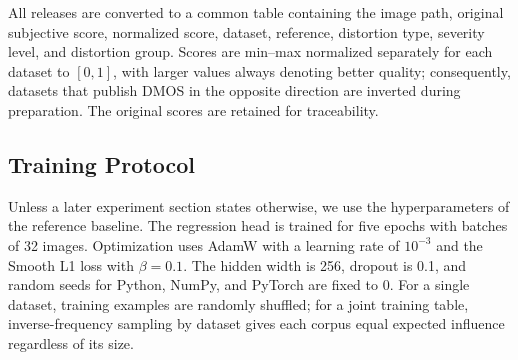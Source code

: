 \documentclass{article}
\begin{document}
\begin{table}[htbp]
\centering
\small
\setlength{\tabcolsep}{4pt}
\caption{Test datasets.}
\label{tab:test-datasets}
\end{table}

All releases are converted to a common table containing the image path, original subjective score, normalized score, dataset, reference, distortion type, severity level, and distortion group. Scores are min--max normalized separately for each dataset to $[0,1]$, with larger values always denoting better quality; consequently, datasets that publish DMOS in the opposite direction are inverted during preparation. The original scores are retained for traceability.

\subsection{Training Protocol}

Unless a later experiment section states otherwise, we use the hyperparameters of the reference baseline. The regression head is trained for five epochs with batches of 32 images. Optimization uses AdamW with a learning rate of $10^{-3}$ and the Smooth L1 loss with $\beta=0.1$. The hidden width is 256, dropout is 0.1, and random seeds for Python, NumPy, and PyTorch are fixed to 0. For a single dataset, training examples are randomly shuffled; for a joint training table, inverse-frequency sampling by dataset gives each corpus equal expected influence regardless of its size.
\end{document}
